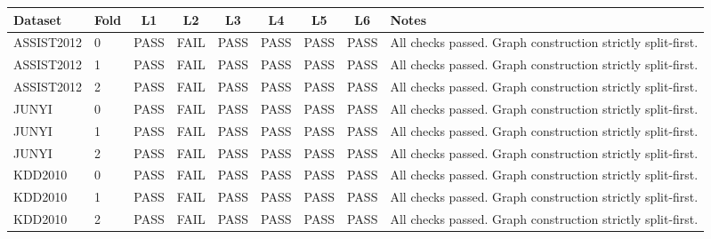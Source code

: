\begin{tabular}{llccccccl}
\hline
Dataset & Fold & L1 & L2 & L3 & L4 & L5 & L6 & Notes \\
\hline
ASSIST2012 & 0 & PASS & FAIL & PASS & PASS & PASS & PASS & All checks passed. Graph construction strictly split-first. \\
ASSIST2012 & 1 & PASS & FAIL & PASS & PASS & PASS & PASS & All checks passed. Graph construction strictly split-first. \\
ASSIST2012 & 2 & PASS & FAIL & PASS & PASS & PASS & PASS & All checks passed. Graph construction strictly split-first. \\
JUNYI & 0 & PASS & FAIL & PASS & PASS & PASS & PASS & All checks passed. Graph construction strictly split-first. \\
JUNYI & 1 & PASS & FAIL & PASS & PASS & PASS & PASS & All checks passed. Graph construction strictly split-first. \\
JUNYI & 2 & PASS & FAIL & PASS & PASS & PASS & PASS & All checks passed. Graph construction strictly split-first. \\
KDD2010 & 0 & PASS & FAIL & PASS & PASS & PASS & PASS & All checks passed. Graph construction strictly split-first. \\
KDD2010 & 1 & PASS & FAIL & PASS & PASS & PASS & PASS & All checks passed. Graph construction strictly split-first. \\
KDD2010 & 2 & PASS & FAIL & PASS & PASS & PASS & PASS & All checks passed. Graph construction strictly split-first. \\
\hline
\end{tabular}